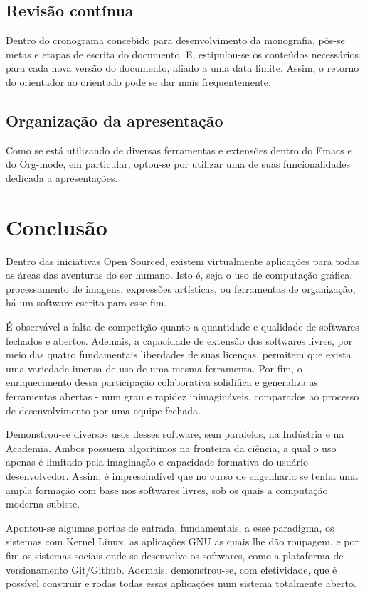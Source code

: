 \documentclass[
12pt,				%
openright,			%
oneside,			%
a4paper,			%
english,			%
french,				%
spanish,			%
brazil,				%
]{abntex2}
\begin{document}
\section{Revisão contínua}

Dentro do cronograma concebido para desenvolvimento da monografia,
pôs-se metas e etapas de escrita do documento. E, estipulou-se os
conteúdos necessários para cada nova versão do documento, aliado a uma
data limite. Assim, o retorno do orientador ao orientado pode se dar
mais frequentemente.

\section{Organização da apresentação}

Como se está utilizando de diversas ferramentas e extensões dentro do
Emacs e do Org-mode, em particular, optou-se por utilizar uma de suas
funcionalidades dedicada a apresentações. 

\chapter{Conclusão}
Dentro das iniciativas Open Sourced, existem virtualmente aplicações
para todas as áreas das aventuras do ser humano. Isto é, seja o uso de
computação gráfica, processamento de imagens, expressões artísticas,
ou ferramentas de organização, há um software escrito para esse fim.

É observável a falta de competição quanto a quantidade e qualidade de
softwares fechados e abertos. Ademais, a capacidade de
extensão dos softwares livres, por meio das quatro fundamentais
liberdades de suas licenças, permitem que exista uma variedade imensa
de uso de uma mesma ferramenta. Por fim, o enriquecimento dessa
participação colaborativa solidifica e generaliza as ferramentas
abertas - num grau e rapidez inimagináveis, comparados ao processo de
desenvolvimento por uma equipe fechada.

Demonstrou-se diversos usos desses software, sem paralelos, na
Indústria e na Academia. Ambos possuem algorítimos na fronteira da
ciência, a qual o uso apenas é limitado pela imaginação e capacidade
formativa do usuário-desenvolvedor. Assim, é imprescindível que no
curso de engenharia se tenha uma ampla formação com base nos softwares
livres, sob os quais a computação moderna subiste.

Apontou-se algumas portas de entrada, fundamentais, a esse paradigma,
os sistemas com Kernel Linux, as aplicações GNU as quais lhe dão
roupagem, e por fim os sistemas sociais onde se desenvolve os
softwares, como a plataforma de versionamento Git/Github. Ademais,
demonstrou-se, com efetividade, que é possível construir e rodas todas
essas aplicações num sistema totalmente aberto.


\end{document}
